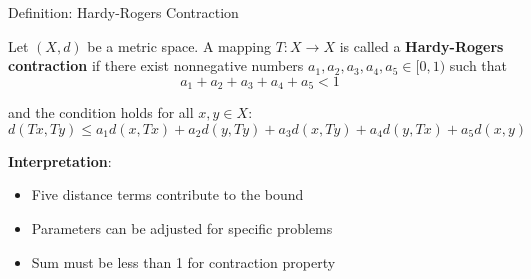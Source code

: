 \documentclass[aspectratio=169,10pt]{beamer}
\begin{document}
\begin{frame}{Definition: Hardy-Rogers Contraction}
    \begin{definition}
        Let $(X, d)$ be a metric space. A mapping $T : X \to X$ is called a
        \textbf{Hardy-Rogers contraction} if there exist nonnegative numbers
        $a_1, a_2, a_3, a_4, a_5 \in [0, 1)$ such that
        \begin{equation*}
            a_1 + a_2 + a_3 + a_4 + a_5 < 1
        \end{equation*}

        and the condition holds for all $x, y \in X$:
        \begin{equation}
            \boxed{d(Tx, Ty) \leq a_1 d(x,Tx) + a_2 d(y,Ty) + a_3 d(x,Ty) + a_4 d(y,Tx) + a_5 d(x,y)}
            \label{eq:hardy-rogers}
        \end{equation}
    \end{definition}

    \vspace{0.3cm}
    \textbf{Interpretation}:
    \begin{itemize}
        \item Five distance terms contribute to the bound
        \item Parameters can be adjusted for specific problems
        \item Sum must be less than 1 for contraction property
    \end{itemize}
\end{frame}
\end{document}
